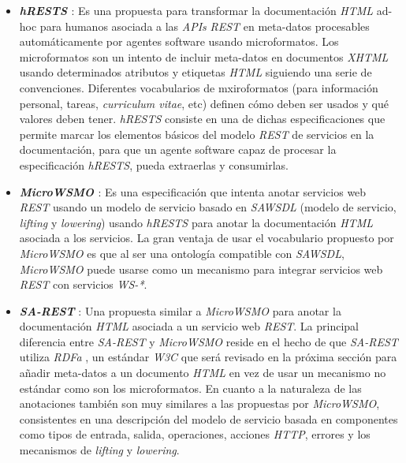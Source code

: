 \begin{itemize}

\item \textbf{\textit{hRESTS} \cite{hrests}}: Es una propuesta para transformar la documentaci\'on \textit{HTML} ad-hoc para humanos asociada a las \textit{APIs} \textit{REST} en meta-datos procesables autom\'aticamente por agentes software usando microformatos. Los microformatos \cite{microformats} son un intento de incluir meta-datos en documentos \textit{XHTML} usando determinados atributos y etiquetas \textit{HTML} siguiendo una serie de convenciones. Diferentes vocabularios de mxiroformatos (para informaci\'on personal, tareas, \textit{curriculum vitae}, etc) definen c\'omo deben ser usados y qu\'e valores deben tener. \textit{hRESTS} consiste en una de dichas especificaciones que permite marcar los elementos b\'asicos del modelo \textit{REST} de servicios en la documentaci\'on, para que un agente software capaz de procesar la especificaci\'on \textit{hRESTS}, pueda extraerlas y consumirlas.

\item \textbf{\textit{MicroWSMO} \cite{microwsmo}}: Es una especificaci\'on que intenta anotar servicios web \textit{REST} usando un modelo de servicio basado en \textit{SAWSDL} \cite{sawsdl} (modelo de servicio, \textit{lifting} y \textit{lowering}) usando \textit{hRESTS} para anotar la documentaci\'on \textit{HTML} asociada a los servicios. La gran ventaja de usar el vocabulario propuesto por \textit{MicroWSMO} es que al ser una ontolog\'ia compatible con \textit{SAWSDL}, \textit{MicroWSMO} puede usarse como un mecanismo para integrar servicios web \textit{REST} con servicios \textit{WS-*}.

\item \textbf{\textit{SA-REST}} \cite{sarest}: Una propuesta similar a \textit{MicroWSMO} para anotar la documentaci\'on \textit{HTML} asociada a un servicio web \textit{REST}. La principal diferencia entre \textit{SA-REST} y \textit{MicroWSMO} reside en el hecho de que \textit{SA-REST} utiliza \textit{RDFa} \cite{rdfa}, un est\'andar \textit{W3C} que ser\'a revisado en la pr\'oxima secci\'on para a\~nadir meta-datos a un documento \textit{HTML} en vez de usar un mecanismo no est\'andar como son los microformatos. En cuanto a la naturaleza de las anotaciones tambi\'en son muy similares a las propuestas por \textit{MicroWSMO}, consistentes en una descripci\'on del modelo de servicio basada en componentes como tipos de entrada, salida, operaciones, acciones \textit{HTTP}, errores y los mecanismos de \textit{lifting} y \textit{lowering}.

\end{itemize}

